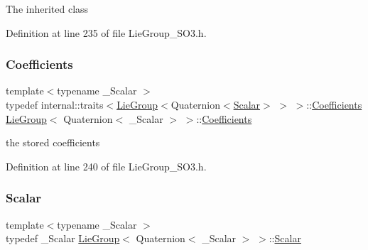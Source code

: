 The inherited class 

Definition at line 235 of file Lie\+Group\+\_\+\+S\+O3.\+h.

\hypertarget{class_lie_group_3_01_quaternion_3_01___scalar_01_4_01_4_a80504cfb3bcbf55c7d4c1e377ef9f782}{}\label{class_lie_group_3_01_quaternion_3_01___scalar_01_4_01_4_a80504cfb3bcbf55c7d4c1e377ef9f782} 
\subsubsection{\texorpdfstring{Coefficients}{Coefficients}}
{\footnotesize\ttfamily template$<$typename \+\_\+\+Scalar $>$ \\
typedef internal\+::traits$<$\hyperlink{class_lie_group}{Lie\+Group}$<$Quaternion$<$\hyperlink{class_lie_group_3_01_quaternion_3_01___scalar_01_4_01_4_a5c9cc4f61c2a1870f44da7951225dc4e}{Scalar}$>$ $>$ $>$\+::\hyperlink{class_lie_group_3_01_quaternion_3_01___scalar_01_4_01_4_a80504cfb3bcbf55c7d4c1e377ef9f782}{Coefficients} \hyperlink{class_lie_group}{Lie\+Group}$<$ Quaternion$<$ \+\_\+\+Scalar $>$ $>$\+::\hyperlink{class_lie_group_3_01_quaternion_3_01___scalar_01_4_01_4_a80504cfb3bcbf55c7d4c1e377ef9f782}{Coefficients}}

the stored coefficients 

Definition at line 240 of file Lie\+Group\+\_\+\+S\+O3.\+h.

\hypertarget{class_lie_group_3_01_quaternion_3_01___scalar_01_4_01_4_a5c9cc4f61c2a1870f44da7951225dc4e}{}\label{class_lie_group_3_01_quaternion_3_01___scalar_01_4_01_4_a5c9cc4f61c2a1870f44da7951225dc4e} 
\subsubsection{\texorpdfstring{Scalar}{Scalar}}
{\footnotesize\ttfamily template$<$typename \+\_\+\+Scalar $>$ \\
typedef \+\_\+\+Scalar \hyperlink{class_lie_group}{Lie\+Group}$<$ Quaternion$<$ \+\_\+\+Scalar $>$ $>$\+::\hyperlink{class_lie_group_3_01_quaternion_3_01___scalar_01_4_01_4_a5c9cc4f61c2a1870f44da7951225dc4e}{Scalar}}

